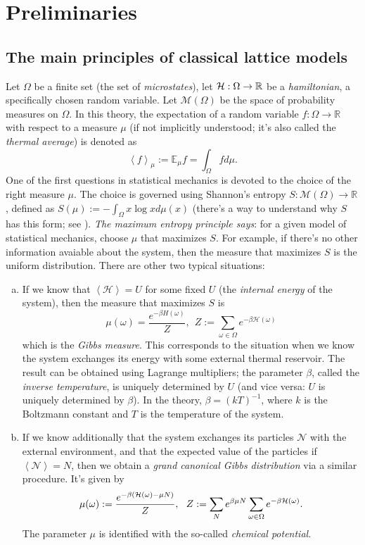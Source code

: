 \section{Preliminaries}
\subsection{The main principles of classical lattice models}
Let $\Omega$ be a finite set (the set of \emph{microstates}), let $\mathcal{H} : \Omega \rightarrow \mathbb R$ be a \emph{hamiltonian}, a specifically chosen random variable. Let $\mathcal M(\Omega)$ be the space of probability measures on $\Omega$. In this theory, the expectation of a random variable $f : \Omega \rightarrow \mathbb R$ with respect to a measure $\mu$ (if not implicitly understood; it's also called the \emph{thermal average}) is denoted as
\[
\left\langle f \right\rangle_{\mu} := \mathbb E_{\mu} f = \int_{\Omega} f d\mu.
\]
One of the first questions in statistical mechanics is devoted to the choice of the right measure $\mu$. The choice is governed using Shannon's entropy $S : \mathcal M(\Omega) \rightarrow \mathbb R$, defined as $S(\mu) := -\int_{\Omega}x\log x d\mu(x)$ (there's a way to understand why $S$ has this form; see \cite{friedli}). \emph{The maximum entropy principle says}: for a given model of statistical mechanics, choose $\mu$ that maximizes $S$. For example, if there's no other information avaiable about the system, then the measure that maximizes $S$ is the uniform distribution. There are other two typical situations:
\begin{enumerate}[(a)]
\item If we know that $\left\langle \mathcal H\right\rangle = U$ for some fixed $U$ (the \emph{internal energy} of the system), then the measure that maximizes $S$ is 
\[
\mu(\omega) = \frac{e^{-\beta H(\omega)}}{Z}, \ \ Z:= \sum_{\omega \in \Omega} e^{-\beta \mathcal H(\omega)} 
\]
which is the \emph{Gibbs measure}. This corresponds to the situation when we know the system exchanges its energy with some external thermal reservoir. The result can be obtained using Lagrange multipliers; the parameter $\beta$, called the \emph{inverse temperature}, is uniquely determined by $U$ (and vice versa: $U$ is uniquely determined by $\beta$). In the theory, $\beta = (kT)^{-1}$, where $k$ is the Boltzmann constant and $T$ is the temperature of the system.
\item If we know additionally that the system exchanges its particles $\mathcal N$ with the external environment, and that the expected value of the particles if $\left\langle \mathcal N \right\rangle = N$, then we obtain a \emph{grand canonical Gibbs distribution} via a similar procedure. It's given by
\[
\mu(\omega) := \frac{e^{-\beta(\mathcal{H}(\omega)-\mu N)}}{Z}, \ \ Z := \sum_{N} e^{\beta \mu N} \sum_{\omega \in \Omega} e^{-\beta \mathcal{H} (\omega)}.
\]
The parameter $\mu$ is identified with the so-called \emph{chemical potential}.
\end{enumerate}

